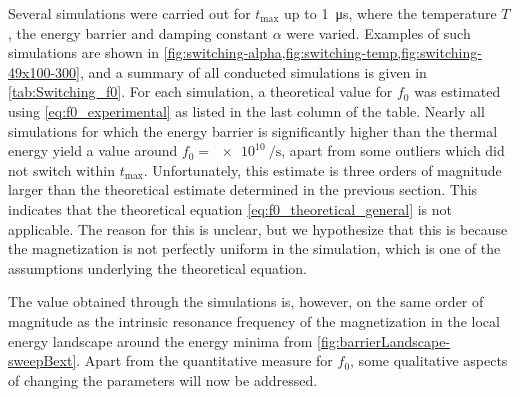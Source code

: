 \documentclass[11pt,a4paper,english,twoside]{article}
\begin{document}
Several simulations were carried out for $t_{\mathrm{max}}$ up to \SI{1}{\micro\second}, where the temperature $T$, the energy barrier and damping constant $\alpha$ were varied. Examples of such simulations are shown in \cref{fig:switching-alpha,fig:switching-temp,fig:switching-49x100-300}, and a summary of all conducted simulations is given in \cref{tab:Switching_f0}. For each simulation, a theoretical value for $f_0$ was estimated using \cref{eq:f0_experimental} as listed in the last column of the table. 
Nearly all simulations for which the energy barrier is significantly higher than the thermal energy yield a value around $f_0=\SI{e10}{\per\second}$, apart from some outliers which did not switch within $t_{\mathrm{max}}$. Unfortunately, this estimate is three orders of magnitude larger than the theoretical estimate determined in the previous section. This indicates that the theoretical equation \eqref{eq:f0_theoretical_general} is not applicable. The reason for this is unclear, but we hypothesize that this is because the magnetization is not perfectly uniform in the simulation, which is one of the assumptions underlying the theoretical equation. \par
The value obtained through the simulations is, however, on the same order of magnitude as the intrinsic resonance frequency of the magnetization in the local energy landscape around the energy minima from \cref{fig:barrierLandscape-sweepBext}.
Apart from the quantitative measure for $f_0$, some qualitative aspects of changing the parameters will now be addressed.
\end{document}
